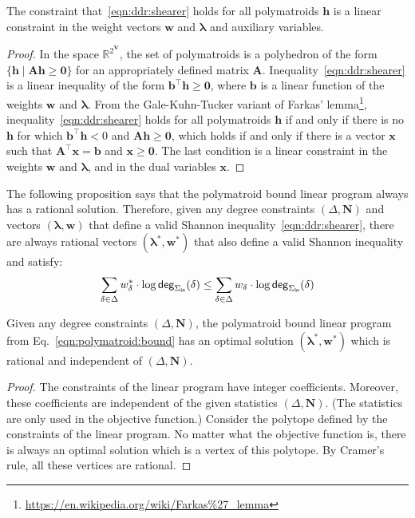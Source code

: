 \documentclass{theoretics}
\newcommand{\degree}{\text{\sf deg}}
\newcommand{\R}{\mathbb R} %
\newcommand{\inn}{\text{\sf in}}
\begin{document}
\begin{proposition}
The constraint that~\eqref{eqn:ddr:shearer} holds for all polymatroids $\bm h$ is a linear constraint in the
weight vectors $\bm w$ and $\bm \lambda$ and auxiliary variables.
\end{proposition}
\begin{proof}
  In the space $\R^{2^{\bm V}}$, the set of polymatroids is a polyhedron of the form
  $\{ \bm h \mid \bm A \bm h \geq \bm 0 \}$ for an appropriately defined matrix $\bm A$.
  Inequality~\eqref{eqn:ddr:shearer} is a linear inequality of the form
  $\bm b^\top \bm h \geq \bm 0$, where $\bm b$ is a linear function of the weights $\bm w$ and $\bm \lambda$.
  From the Gale-Kuhn-Tucker variant of Farkas' lemma\footnote{\url{https://en.wikipedia.org/wiki/Farkas\%27_lemma}},
  inequality~\eqref{eqn:ddr:shearer} holds for all polymatroids $\bm h$ if and only if
  there is no $\bm h$ for which $\bm b^\top \bm h < 0$ and $\bm A\bm h \geq \bm 0$,
  which holds if and only if there is a vector $\bm x$ such that
  $\bm A^\top \bm x = \bm b$ and $\bm x \geq \bm 0$.
  The last condition is a linear constraint in the weights $\bm w$ and $\bm \lambda$, and
  in the dual variables $\bm x$.
\end{proof}

    The following proposition says that the polymatroid bound linear program always has a rational solution.
    Therefore, given any degree constraints $(\Delta, \bm N)$ and vectors $(\bm\lambda,\bm w)$ that define a valid Shannon inequality~\eqref{eqn:ddr:shearer},
    there are always rational vectors $(\bm\lambda^*,\bm w^*)$ that also define a valid Shannon inequality and satisfy:
    \begin{align*}
        \sum_{\delta\in\Delta}w^*_\delta\cdot \log \degree_{\Sigma_\inn}(\delta) \leq
        \sum_{\delta\in\Delta}w_\delta\cdot \log \degree_{\Sigma_\inn}(\delta)
    \end{align*}
    \begin{proposition}
        Given any degree constraints $(\Delta, \bm N)$, the polymatroid bound linear program from Eq.~\eqref{eqn:polymatroid:bound} has an optimal solution $(\bm\lambda^*,\bm w^*)$ which is rational and independent of $(\Delta, \bm N)$.
        \label{prop:rational:shannon}
    \end{proposition}
    \begin{proof}
        The constraints of the linear program have integer coefficients.
        Moreover, these coefficients are independent of the given statistics $(\Delta, \bm N)$.
        (The statistics are only used in the objective function.)
        Consider the polytope defined by the constraints of the linear program.
        No matter what the objective function is, there is always an optimal solution which is a vertex of this polytope. By Cramer's rule, all these vertices are rational.
    \end{proof}
\end{document}
